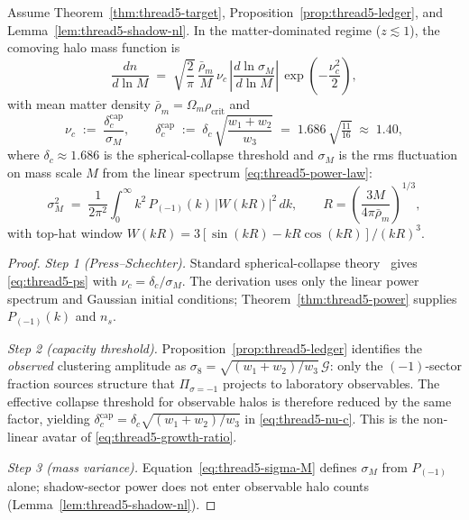 \begin{theorem}
\label{thm:thread5-press-schechter}
Assume Theorem~\ref{thm:thread5-target}, Proposition~\ref{prop:thread5-ledger},
and Lemma~\ref{lem:thread5-shadow-nl}. In the matter-dominated regime
($z\lesssim 1$), the comoving halo mass function is
\begin{equation}\label{eq:thread5-ps}
  \frac{dn}{d\ln M}
  \;=\;
  \sqrt{\frac{2}{\pi}}\,
  \frac{\bar\rho_m}{M}\,
  \nu_c\,
  \left|\frac{d\ln\sigma_M}{d\ln M}\right|\,
  \exp\!\left(-\frac{\nu_c^2}{2}\right),
\end{equation}
with mean matter density $\bar\rho_m=\Omega_m\rho_{\mathrm{crit}}$ and
\begin{equation}\label{eq:thread5-nu-c}
  \nu_c
  \;:=\;
  \frac{\delta_c^{\mathrm{cap}}}{\sigma_M},
  \qquad
  \delta_c^{\mathrm{cap}}
  \;:=\;
  \delta_c\,
  \sqrt{\frac{w_1+w_2}{w_3}}
  \;=\;
  1.686\,\sqrt{\tfrac{11}{16}}
  \;\approx\;
  1.40,
\end{equation}
where $\delta_c\approx 1.686$ is the spherical-collapse threshold and
$\sigma_M$ is the rms fluctuation on mass scale $M$ from the linear spectrum
\eqref{eq:thread5-power-law}:
\begin{equation}\label{eq:thread5-sigma-M}
  \sigma_M^2
  \;=\;
  \frac{1}{2\pi^2}\int_0^\infty k^2\,P_{(-1)}(k)\,|W(kR)|^2\,dk,
  \qquad
  R=\left(\frac{3M}{4\pi\bar\rho_m}\right)^{1/3},
\end{equation}
with top-hat window $W(kR)=3[\sin(kR)-kR\cos(kR)]/(kR)^3$.
\end{theorem}

\begin{proof}
\emph{Step 1 (Press--Schechter).}
Standard spherical-collapse theory~\cite{Press1974} gives \eqref{eq:thread5-ps}
with $\nu_c=\delta_c/\sigma_M$. The derivation uses only the linear power
spectrum and Gaussian initial conditions; Theorem~\ref{thm:thread5-power}
supplies $P_{(-1)}(k)$ and $n_s$.

\emph{Step 2 (capacity threshold).}
Proposition~\ref{prop:thread5-ledger} identifies the \emph{observed} clustering
amplitude as $\sigma_8=\sqrt{(w_1+w_2)/w_3}\,\mathcal{G}$: only the
$(-1)$-sector fraction sources structure that $\Pi_{\sigma=-1}$ projects to
laboratory observables. The effective collapse threshold for observable halos is
therefore reduced by the same factor, yielding
$\delta_c^{\mathrm{cap}}=\delta_c\sqrt{(w_1+w_2)/w_3}$ in
\eqref{eq:thread5-nu-c}. This is the non-linear avatar of
\eqref{eq:thread5-growth-ratio}.

\emph{Step 3 (mass variance).}
Equation~\eqref{eq:thread5-sigma-M} defines $\sigma_M$ from $P_{(-1)}$ alone;
shadow-sector power does not enter observable halo counts
(Lemma~\ref{lem:thread5-shadow-nl}).
\end{proof}

